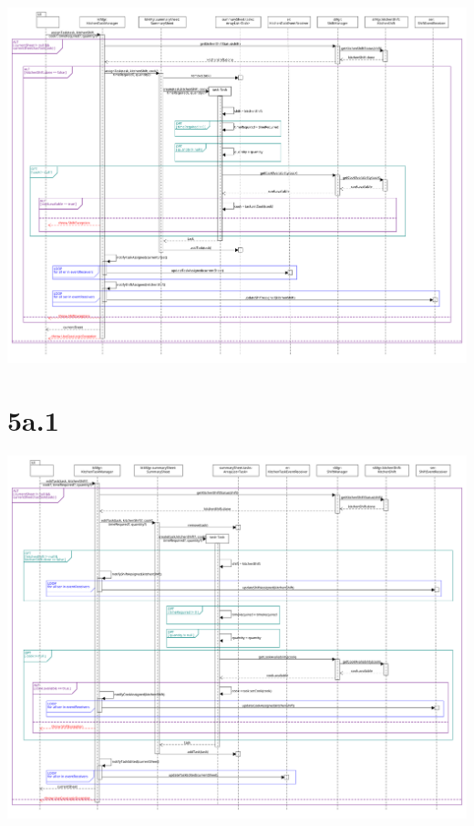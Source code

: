 \begin{center}
  \includegraphics[scale = 0.25]{images/DSD/DSD 5.png}
\end{center}

\pagebreak

\section*{5a.1}

\begin{center}
  \includegraphics[scale = 0.23]{images/DSD/DSD 5a.png}
\end{center}

